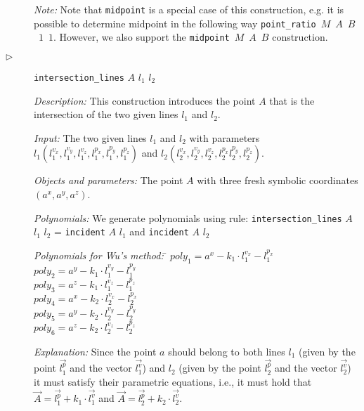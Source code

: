 \documentclass{aicom2e}
\begin{document}
\begin{description}
{\em Note:} Note that {\tt midpoint} is a special case of this
construction, e.g. it is possible to determine midpoint in the
following way \mbox{{\tt point\_ratio} $M$ $A$ $B$ $1$ $1$}. However,
we also support the \mbox{{\tt midpoint} $M$ $A$ $B$} construction.

\item[$\triangleright$] {\tt intersection\_lines} $A$ $l_1$ $l_2$

  {\em Description:} This construction introduces the point $A$ that is
  the intersection of the two given lines $l_1$ and $l_2$.

  {\em Input:} The two given lines $l_1$ and $l_2$ with parameters
  $l_1(l_1^{v_x}, l_1^{v_y}, l_1^{v_z}, l_1^{p_x}, l_1^{p_y},
  l_1^{p_z})$ and $l_2(l_2^{v_x}, l_2^{v_y}, l_2^{v_z}, l_2^{p_x}
  l_2^{p_y}, l_2^{p_z})$.

  {\em Objects and parameters:} The point $A$ with three fresh
  symbolic coordinates $(a^x, a^y, a^z)$.

  {\em Polynomials:} We generate polynomials using rule:
  {\tt intersection\_lines} $A$ $l_1$ $l_2$ = {\tt incident} $A$ $l_1$ and {\tt incident} $A$ $l_2$

\begin{tabbing}
{\em Polynomials for Wu's method:} \= $poly_1 = a^x - k_1\cdot l_1^{v_x} - l_1^{p_x}$ \\
                   \> $poly_2 = a^y - k_1\cdot l_1^{v_y} - l_1^{p_y}$ \\
                   \> $poly_3 = a^z - k_1\cdot l_1^{v_z} - l_1^{p_z}$ \\
                   \> $poly_4 = a^x - k_2\cdot l_2^{v_x} - l_2^{p_x}$ \\
                   \> $poly_5 = a^y - k_2\cdot l_2^{v_y} - l_2^{p_y}$ \\
                   \> $poly_6 = a^z - k_2\cdot l_2^{v_z} - l_2^{p_z}$
\end{tabbing}

{\em Explanation:} 
Since the point $a$ should belong to both lines $l_1$ (given by the
point $\overrightarrow{l_1^p}$ and the vector
$\overrightarrow{l_1^v}$) and $l_2$ (given by the point
$\overrightarrow{l_2^p}$ and the vector $\overrightarrow{l_2^v}$) it
must satisfy their parametric equations, i.e., it must hold that
$\overrightarrow{A} = \overrightarrow{l_1^p} + k_1 \cdot
\overrightarrow{l_1^v}$
and
$\overrightarrow{A} = \overrightarrow{l_2^p} + k_2 \cdot
\overrightarrow{l_2^v}$.


\end{description}
\end{document}
